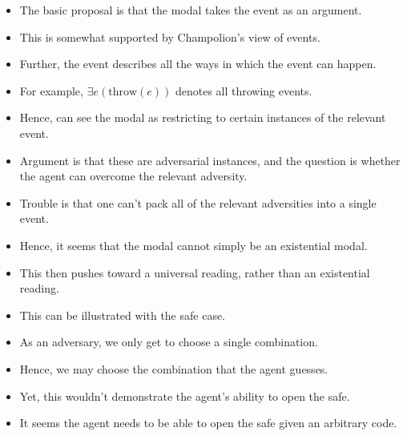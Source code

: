\documentclass[10pt]{article}
\begin{document}
\begin{itemize}
\item The basic proposal is that the modal takes the event as an argument.
\item This is somewhat supported by Champolion's view of events.
\item Further, the event describes all the ways in which the event can happen.
\item For example, \(\exists e(\text{throw}(e))\) denotes all throwing events.
\item Hence, can see the modal as restricting to certain instances of the relevant event.
\item Argument is that these are adversarial instances, and the question is whether the agent can overcome the relevant adversity.
\item Trouble is that one can't pack all of the relevant adversities into a single event.
\item Hence, it seems that the modal cannot simply be an existential modal.
\item This then pushes toward a universal reading, rather than an existential reading.
\item This can be illustrated with the safe case.
\item As an adversary, we only get to choose a single combination.
\item Hence, we may choose the combination that the agent guesses.
\item Yet, this wouldn't demonstrate the agent's ability to open the safe.
\item It seems the agent needs to be able to open the safe given an arbitrary code.
\end{itemize}
\end{document}

